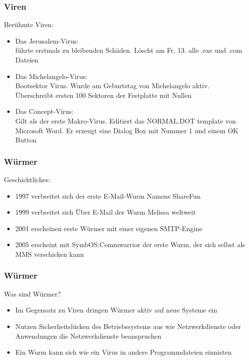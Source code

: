 \documentclass{beamer}
\begin{document}
\begin{frame}
	\frametitle{Viren}
	\begin{block}{Berühmte Viren:}
		\begin{itemize}
			\item Das Jerusalem-Virus:\\
			führte erstmals zu bleibenden Schäden. Löscht am Fr. 13. alle .exe und .com Dateien
			\item Das Michelangelo-Virus:\\
			Bootsektor Virus. Wurde am Geburtstag von Michelangelo aktiv. Überschreibt ersten 100 Sektoren der Festplatte mit Nullen
			\item Das Concept-Virus:\\
			Gilt als der erste Makro-Virus. Editiert das NORMAL.DOT template von Microsoft Word. Er erzeugt eine Dialog Box mit Nummer 1 und einem OK Button
		\end{itemize}
	\end{block}			
\end{frame}

\begin{frame}
	\frametitle{Würmer}
		\begin{block}{Geschichtliches:}
			\begin{itemize}
				\item 1997 verbreitet sich der erste E-Mail-Wurm Namens ShareFun
				\item 1999 verbreitet sich Über E-Mail der Wurm Melissa weltweit
				\item 2001 erscheinen erste Würmer mit einer eigenen SMTP-Engine
				\item 2005 erscheint mit SymbOS.Commwarrior der erste Wurm, der sich selbst als MMS verschicken kann
			\end{itemize}
		\end{block}
\end{frame}

\begin{frame}
	\frametitle{Würmer}
		\begin{block}{Was sind Würmer?}
			\begin{itemize}
				\item Im Gegensatz zu Viren dringen Würmer aktiv auf neue Systeme ein
				\item Nutzen Sicherheitslücken des Betriebssystems aus wie Netzwerkdienste oder Anwendungen die Netzwerkdienste beanspruchen
				\item Ein Wurm kann sich wie ein Virus in andere Programmdateien einnisten
			\end{itemize}
		\end{block}
\end{frame}
\end{document}
